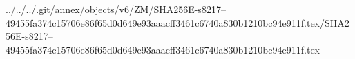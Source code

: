 ../../../.git/annex/objects/v6/ZM/SHA256E-s8217--49455fa374c15706e86f65d0d649e93aaacff3461c6740a830b1210bc94e911f.tex/SHA256E-s8217--49455fa374c15706e86f65d0d649e93aaacff3461c6740a830b1210bc94e911f.tex